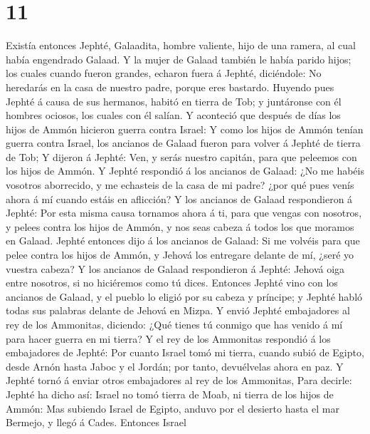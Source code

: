 \hypertarget{section-10}{%
\section{11}\label{section-10}}

 Existía entonces Jephté, Galaadita, hombre valiente, hijo
de una ramera, al cual había engendrado Galaad.  Y la mujer
de Galaad también le había parido hijos; los cuales cuando fueron
grandes, echaron fuera á Jephté, diciéndole: No heredarás en la casa de
nuestro padre, porque eres bastardo.  Huyendo pues Jephté á
causa de sus hermanos, habitó en tierra de Tob; y juntáronse con él
hombres ociosos, los cuales con él salían.  Y aconteció que
después de días los hijos de Ammón hicieron guerra contra Israel:
 Y como los hijos de Ammón tenían guerra contra Israel, los
ancianos de Galaad fueron para volver á Jephté de tierra de Tob;
 Y dijeron á Jephté: Ven, y serás nuestro capitán, para que
peleemos con los hijos de Ammón.  Y Jephté respondió á los
ancianos de Galaad: ¿No me habéis vosotros aborrecido, y me echasteis de
la casa de mi padre? ¿por qué pues venís ahora á mí cuando estáis en
aflicción?  Y los ancianos de Galaad respondieron á Jephté:
Por esta misma causa tornamos ahora á ti, para que vengas con nosotros,
y pelees contra los hijos de Ammón, y nos seas cabeza á todos los que
moramos en Galaad.  Jephté entonces dijo á los ancianos de
Galaad: Si me volvéis para que pelee contra los hijos de Ammón, y Jehová
los entregare delante de mí, ¿seré yo vuestra cabeza?  Y
los ancianos de Galaad respondieron á Jephté: Jehová oiga entre
nosotros, si no hiciéremos como tú dices.  Entonces Jephté
vino con los ancianos de Galaad, y el pueblo lo eligió por su cabeza y
príncipe; y Jephté habló todas sus palabras delante de Jehová en Mizpa.
 Y envió Jephté embajadores al rey de los Ammonitas,
diciendo: ¿Qué tienes tú conmigo que has venido á mí para hacer guerra
en mi tierra?  Y el rey de los Ammonitas respondió á los
embajadores de Jephté: Por cuanto Israel tomó mi tierra, cuando subió de
Egipto, desde Arnón hasta Jaboc y el Jordán; por tanto, devuélvelas
ahora en paz.  Y Jephté tornó á enviar otros embajadores al
rey de los Ammonitas,  Para decirle: Jephté ha dicho así:
Israel no tomó tierra de Moab, ni tierra de los hijos de Ammón:
 Mas subiendo Israel de Egipto, anduvo por el desierto
hasta el mar Bermejo, y llegó á Cades.  Entonces Israel

